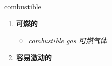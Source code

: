 
\begin{frame}
{\huge combustible}
\begin{center}
\begin{enumerate}\Large
  \item \textbf{可燃的}
  \begin{itemize}
    \item \em{\Large{combustible gas 可燃气体}}
  \end{itemize}
  \item \textbf{容易激动的}
\end{enumerate}
\end{center}
\end{frame}
